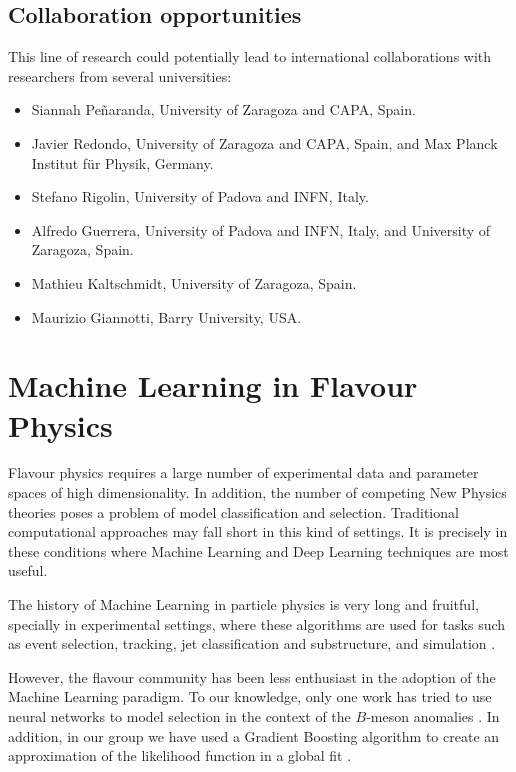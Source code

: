 \documentclass[combined.tex]{subfiles}
\begin{document}
\subsection{Collaboration opportunities}
This line of research could potentially lead to international collaborations with researchers from several universities: 
\begin{itemize}
\item Siannah Peñaranda, University of Zaragoza and CAPA, Spain.
\item Javier Redondo, University of Zaragoza and CAPA, Spain, and Max Planck Institut für Physik, Germany.
\item Stefano Rigolin, University of Padova and INFN, Italy.
\item Alfredo Guerrera, University of Padova and INFN, Italy, and University of Zaragoza, Spain.
\item Mathieu Kaltschmidt, University of Zaragoza, Spain.
\item Maurizio Giannotti, Barry University, USA.
\end{itemize}

\section{Machine Learning in Flavour Physics}

Flavour physics requires a large number of experimental data and parameter spaces of high dimensionality. In addition, the number of competing New Physics theories poses a problem of model classification and selection. Traditional computational approaches may fall short in this kind of settings. It is precisely in these conditions where Machine Learning and Deep Learning techniques are most useful.

The history of Machine Learning in particle physics is very long and fruitful, specially in experimental settings, where these algorithms are used for tasks such as event selection, tracking, jet classification and substructure, and simulation \cite{Guest:2018yhq,Albertsson:2018maf,Schwartz:2021ftp,Alanazi:2021grv}. 

However, the flavour community has been less enthusiast in the adoption of the Machine Learning paradigm. To our knowledge, only one work has tried to use neural networks to model selection in the context of the $B$-meson anomalies \cite{Bhattacharya:2020vme}. In addition, in our group we have used a Gradient Boosting algorithm to create an approximation of the likelihood function in a global fit \cite{Alda:2021krg}.  
\end{document}
